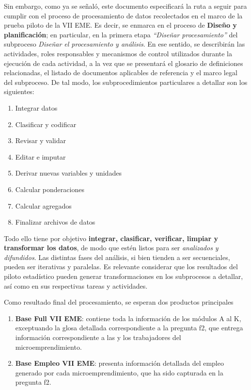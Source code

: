 \documentclass[
]{article}
\providecommand{\tightlist}{%
  \setlength{\itemsep}{0pt}\setlength{\parskip}{0pt}}
\begin{document}
Sin embargo, como ya se señaló, este documento especificará la ruta a seguir para cumplir con el proceso de procesamiento de datos recolectados en el marco de la prueba piloto de la VII EME. Es decir, se enmarca en el proceso de \textbf{Diseño y planificación}; en particular, en la primera etapa \emph{``Diseñar procesamiento''} del subproceso \emph{Diseñar el procesamiento y análisis}. En ese sentido, se describirán las actividades, roles responsables y mecanismos de control utilizados durante la ejecución de cada actividad, a la vez que se presentará el glosario de definiciones relacionadas, el listado de documentos aplicables de referencia y el marco legal del subproceso. De tal modo, los subprocedimientos particulares a detallar son los siguientes:

\begin{enumerate}
\def\labelenumi{\arabic{enumi}.}
\tightlist
\item
  Integrar datos
\item
  Clasificar y codificar
\item
  Revisar y validar
\item
  Editar e imputar
\item
  Derivar nuevas variables y unidades
\item
  Calcular ponderaciones
\item
  Calcular agregados
\item
  Finalizar archivos de datos
\end{enumerate}

Todo ello tiene por objetivo \textbf{integrar, clasificar, verificar, limpiar y transformar los datos}, de modo que estén listos para ser \emph{analizados y difundidos}. Las distintas fases del análisis, si bien tienden a ser secuenciales, pueden ser iterativas y paralelas. Es relevante considerar que los resultados del piloto estadístico pueden generar transformaciones en los subprocesos a detallar, así como en sus respectivas tareas y actividades.

Como resultado final del procesamiento, se esperan dos productos principales

\begin{enumerate}
\def\labelenumi{\arabic{enumi}.}
\item
  \textbf{Base Full VII EME}: contiene toda la información de los módulos A al K, exceptuando la glosa detallada correspondiente a la pregunta f2, que entrega información correspondiente a las y los trabajadores del microemprendimiento.
\item
  \textbf{Base Empleo VII EME}: presenta información detallada del empleo generado por cada microemprendimiento, que ha sido capturada en la pregunta f2.
\end{enumerate}
\end{document}
